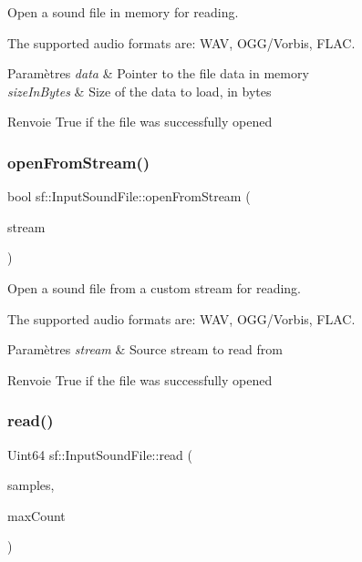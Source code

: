Open a sound file in memory for reading. 

The supported audio formats are\+: W\+AV, O\+G\+G/\+Vorbis, F\+L\+AC.


\begin{DoxyParams}{Paramètres}
{\em data} & Pointer to the file data in memory \\
\hline
{\em size\+In\+Bytes} & Size of the data to load, in bytes\\
\hline
\end{DoxyParams}
\begin{DoxyReturn}{Renvoie}
True if the file was successfully opened 
\end{DoxyReturn}
\mbox{\label{classsf_1_1InputSoundFile_a32b76497aeb088a2b46dc6efd819b909}} 
\subsubsection{\texorpdfstring{open\+From\+Stream()}{openFromStream()}}
{\footnotesize\ttfamily bool sf\+::\+Input\+Sound\+File\+::open\+From\+Stream (\begin{DoxyParamCaption}\item[{\hyperlink{classsf_1_1InputStream}{Input\+Stream} \&}]{stream }\end{DoxyParamCaption})}



Open a sound file from a custom stream for reading. 

The supported audio formats are\+: W\+AV, O\+G\+G/\+Vorbis, F\+L\+AC.


\begin{DoxyParams}{Paramètres}
{\em stream} & Source stream to read from\\
\hline
\end{DoxyParams}
\begin{DoxyReturn}{Renvoie}
True if the file was successfully opened 
\end{DoxyReturn}
\mbox{\label{classsf_1_1InputSoundFile_a83d6f64617456601edeb0daf9d14a17f}} 
\subsubsection{\texorpdfstring{read()}{read()}}
{\footnotesize\ttfamily Uint64 sf\+::\+Input\+Sound\+File\+::read (\begin{DoxyParamCaption}\item[{Int16 $\ast$}]{samples,  }\item[{Uint64}]{max\+Count }\end{DoxyParamCaption})}



